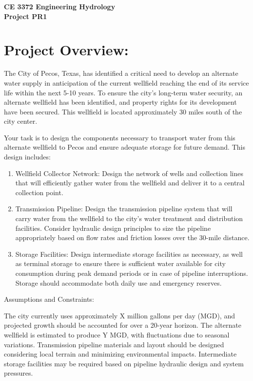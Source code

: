 \documentclass[12pt]{article}
\begin{document}
\begin{center}
{\textbf{{ CE 3372 Engineering Hydrology} \\ {Project PR1}}}
\end{center}

\section*{Project Overview:}
The City of Pecos, Texas, has identified a critical need to develop an alternate water supply in anticipation of the current wellfield reaching the end of its service life within the next 5-10 years. To ensure the city's long-term water security, an alternate wellfield has been identified, and property rights for its development have been secured. This wellfield is located approximately 30 miles south of the city center.

Your task is to design the components necessary to transport water from this alternate wellfield to Pecos and ensure adequate storage for future demand. This design includes:

\begin{enumerate}
\item Wellfield Collector Network: Design the network of wells and collection lines that will efficiently gather water from the wellfield and deliver it to a central collection point.
\item Transmission Pipeline: Design the transmission pipeline system that will carry water from the wellfield to the city’s water treatment and distribution facilities. Consider hydraulic design principles to size the pipeline appropriately based on flow rates and friction losses over the 30-mile distance.
\item Storage Facilities: Design intermediate storage facilities as necessary, as well as terminal storage to ensure there is sufficient water available for city consumption during peak demand periods or in case of pipeline interruptions. Storage should accommodate both daily use and emergency reserves.
\end{enumerate}

Assumptions and Constraints:

    The city currently uses approximately X million gallons per day (MGD), and projected growth should be accounted for over a 20-year horizon.
    The alternate wellfield is estimated to produce Y MGD, with fluctuations due to seasonal variations.
    Transmission pipeline materials and layout should be designed considering local terrain and minimizing environmental impacts.
    Intermediate storage facilities may be required based on pipeline hydraulic design and system pressures.
\end{document}
